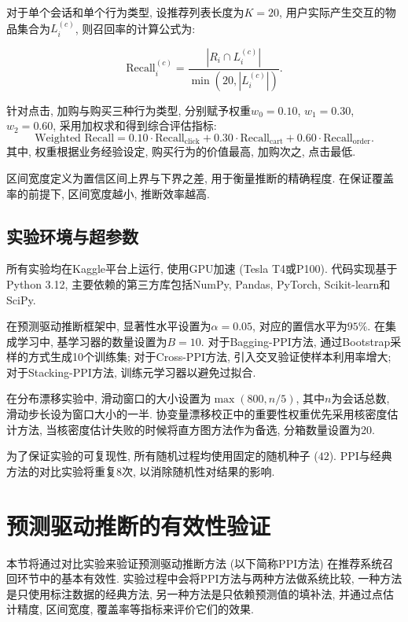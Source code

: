 \documentclass[a4paper, AutoFakeBold, UTF8]{ctexrep}
\theoremstyle{plain}
\numberwithin{equation}{chapter}
\begin{document}
对于单个会话和单个行为类型, 设推荐列表长度为$K=20$, 用户实际产生交互的物品集合为$L_i^{ (c) }$, 则召回率的计算公式为: 

\begin{equation}
\text{Recall}_{i}^{ (c) } = \frac{|R_i \cap L_i^{ (c) }|}{\min (20, |L_i^{ (c) }|) }. \tag{4.1}
\end{equation}

针对点击, 加购与购买三种行为类型, 分别赋予权重$w_0=0.10$, $w_1=0.30$, $w_2=0.60$, 采用加权求和得到综合评估指标: 
\begin{equation}
\text{Weighted Recall} = 0.10 \cdot \text{Recall}_{\text{click}} + 0.30 \cdot \text{Recall}_{\text{cart}} + 0.60 \cdot \text{Recall}_{\text{order}}. \tag{4.2}
\end{equation}
其中, 权重根据业务经验设定, 购买行为的价值最高, 加购次之, 点击最低. 

区间宽度定义为置信区间上界与下界之差, 用于衡量推断的精确程度. 在保证覆盖率的前提下, 区间宽度越小, 推断效率越高. 

\subsection{实验环境与超参数}

所有实验均在Kaggle平台上运行, 使用GPU加速 (Tesla T4或P100). 代码实现基于Python 3.12, 主要依赖的第三方库包括NumPy, Pandas, PyTorch, Scikit-learn和SciPy. 

在预测驱动推断框架中, 显著性水平设置为$\alpha = 0.05$, 对应的置信水平为$95\%$. 
在集成学习中, 基学习器的数量设置为$B=10$. 对于Bagging-PPI方法, 通过Bootstrap采样的方式生成10个训练集; 对于Cross-PPI方法, 引入交叉验证使样本利用率增大; 对于Stacking-PPI方法, 训练元学习器以避免过拟合. 

在分布漂移实验中, 滑动窗口的大小设置为$\max (800, n/5) $, 其中$n$为会话总数, 滑动步长设为窗口大小的一半. 协变量漂移校正中的重要性权重优先采用核密度估计方法, 当核密度估计失败的时候将直方图方法作为备选, 分箱数量设置为20. 

为了保证实验的可复现性, 所有随机过程均使用固定的随机种子 ($42$). PPI与经典方法的对比实验将重复8次, 以消除随机性对结果的影响. 

\section{预测驱动推断的有效性验证}

本节将通过对比实验来验证预测驱动推断方法 (以下简称PPI方法) 在推荐系统召回环节中的基本有效性. 实验过程中会将PPI方法与两种方法做系统比较, 一种方法是只使用标注数据的经典方法, 另一种方法是只依赖预测值的填补法, 并通过点估计精度, 区间宽度, 覆盖率等指标来评价它们的效果. 
\end{document}
